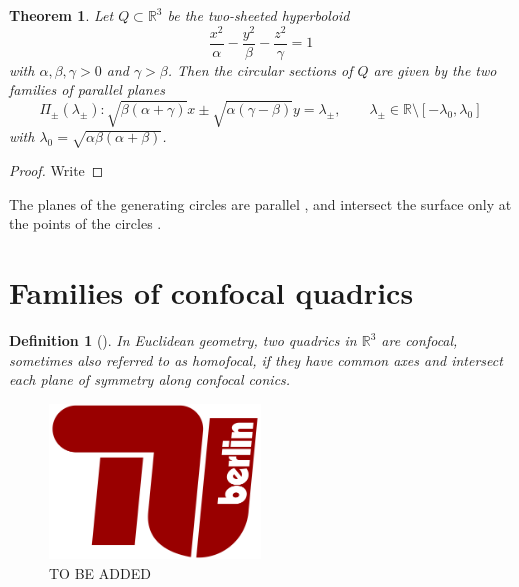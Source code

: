 \documentclass[12pt,a4paper]{article}
\theoremstyle{BoldTopSpacing}
\newtheorem{theorem}{Theorem}[section]
\theoremstyle{BoldTopSpacing}
\theoremstyle{BoldTopSpacing}
\theoremstyle{BoldTopBottomSpacing}
\newtheorem{definition}{Definition}[section]
\theoremstyle{BoldTopSpacing}
\theoremstyle{BoldTopBottomSpacing}
\theoremstyle{remark}
\begin{document}
\begin{theorem}
\label{thm:circular-sections-hyperboloid}
Let $Q \subset \mathbb{R}^3$ be the two-sheeted hyperboloid
\begin{equation}
\label{eq:two-sheeted-alpha-beta-gamma}
\frac{x^2}{\alpha} - \frac{y^2}{\beta} - \frac{z^2}{\gamma} = 1
\end{equation}
with $\alpha, \beta, \gamma > 0$ and $\gamma > \beta$. Then the circular sections of $Q$ are given by the two families of parallel planes
\begin{equation}
\label{eq:planes-two-sheeted}
\Pi_{\pm}(\lambda_{\pm}) :\sqrt{\beta (\alpha + \gamma)} x \pm \sqrt{\alpha (\gamma - \beta)} y = \lambda_{\pm}, \quad \quad \lambda_{\pm} \in \mathbb{R} \setminus \left[-\lambda_{0}, \lambda_{0} \right]
\end{equation}
with $\lambda_{0} = \sqrt{\alpha \beta (\alpha+\beta)}$.
\end{theorem}

\begin{proof}
    Write
\end{proof}

The planes of the generating circles are parallel \cite[\textcolor{CitationColor}{\textit{Lemma~2.1}}]{nilovSurfaceContainingLine2011}, and intersect the surface only at the points of the circles \cite[\textcolor{CitationColor}{\textit{Lemma~2.6}}]{nilovSurfaceContainingLine2011}.

\pagebreak
\section{Families of confocal quadrics}
\label{sec:confocal-quadrics}

\begin{definition}[]
\label{def:confocal-quadrics}
In Euclidean geometry, two quadrics in $\mathbb{R}^3$ are \textit{confocal}, sometimes also referred to as \textit{homofocal}, if they have common axes and intersect each plane of symmetry along confocal conics.
\end{definition}

\begin{figure}[H]
    \centering
    \includegraphics[width=0.5\textwidth]{TU-Berlin-Logo.png}
    \caption{TO BE ADDED}
    \label{fig:figgg}
\end{figure}
\end{document}
